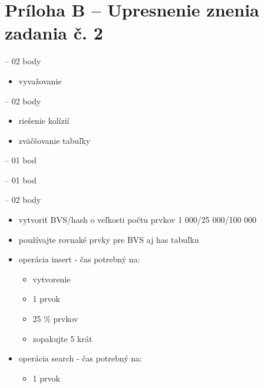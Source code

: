 \documentclass[a4paper,slovak,12pt]{article}
\begin{document}
    \section{Príloha B – Upresnenie znenia zadania č. 2}\label{sec:priloha-b-upresnenie-znenia-zadania-c-2}
    \begin{itemize}
        \item {  – 02 body
            \begin{itemize}
                \item vyvažovanie
            \end{itemize}
            \item { – 02 body
                \begin{itemize}
                    \item riešenie kolízií
                    \item zväčšovanie tabuľky
                \end{itemize}
                \item { – 01 bod
                \item { – 01 bod
                \item  { – 02 body
                    \begin{itemize}
                        \item vytvoriť BVS/hash o veľkosti počtu prvkov 1 000/25 000/100 000
                        \item používajte rovnaké prvky pre BVS aj has tabuľku
                        \item operácia insert - čas potrebný na:
                        \begin{itemize}
                            \item vytvorenie
                            \item 1 prvok
                            \item 25 \% prvkov
                            \item zopakujte 5 krát
                        \end{itemize}
                        \item operácia search - čas potrebný na:
                        \begin{itemize}
                            \item 1 prvok

\end{itemize}
\end{itemize}}}}}}
\end{itemize}
\end{document}
